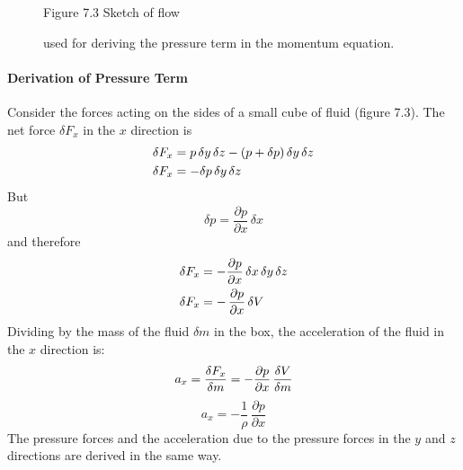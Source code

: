 \begin{figure}[h!]
\centering
\footnotesize
Figure 7.3 Sketch of flow \rule{0mm}{3ex}used for deriving the
pressure term in the momentum equation.

\label{fig:pressuresketch}
\vspace{-3ex}
\end{figure}

\paragraph{Derivation of Pressure Term}
Consider the forces acting on the sides of a small cube of fluid
(figure 7.3).  The net force $\delta F_x$ in the $x$ direction is
\begin{align}
\delta F_x &= p\,\delta{y}\,\delta{z} - (p + \delta{p})\,\delta{y}\,\delta{z}
\notag \\
\delta F_x &= - \delta{p}\,\delta{y}\,\delta{z} \notag
\end{align}
But
\begin{displaymath}
\delta{p} = \frac{\partial{p}}{\partial{x}}\,\delta{x}
\end{displaymath}
and therefore
\begin{align}
\delta F_x &= - \frac{\partial{p}}{\partial{x}}\,\delta{x}\,\delta{y}\,\delta{z}
\notag \\
\delta F_x &=-\,\frac{\partial{p}}{\partial{x}}\, \delta{V} \notag
\end{align}
Dividing by the mass of the fluid $\delta m$ in the box, the
acceleration of the fluid in the $x$ direction is:
\begin{equation}
a_x = \frac{{\delta F_x}}{\delta{m}} = - \frac{\partial{p}}{\partial{x}}\,
\frac{\delta{V}}{\delta{m}} \notag
\end{equation}
\begin{equation}
\boxed{a_x = - \frac{1}{\rho}\,\frac{\partial{p}}{\partial{x}}}
\end{equation}
The pressure forces and the acceleration due to the pressure forces in the $y$
and
$z$ directions are derived in the same way.

